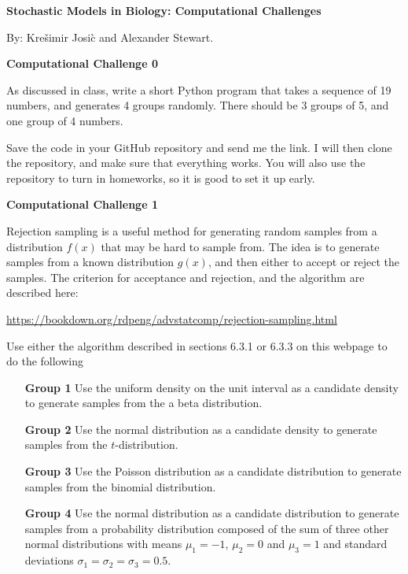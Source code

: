 \documentclass[12pt]{article}
\begin{document}
\begin{center}
{\Huge \bf Stochastic Models in Biology: Computational Challenges
\\ \vskip5mm  }
\end{center}

By: Kre\v simir Josi\`c and Alexander Stewart.

\begin{center}
{\Large \bf Computational Challenge 0
\\ \vskip5mm  }
\end{center}

As discussed in class, write a short Python program that takes a sequence of 19 numbers, and 
generates 4 groups randomly. There should be 3 groups of 5, and one group of 4 numbers.

Save the code in your GitHub repository and send me the link.  I will then clone the repository, and
make sure that everything works.  You will also use the repository to turn in homeworks, so 
it is good to set it up early.


\begin{center}
{\Large \bf Computational Challenge 1
\\ \vskip5mm }
\end{center}

Rejection sampling is a  useful method for generating random samples from a distribution $f(x)$ that 
may be hard to sample from.  The idea is to generate samples from a known distribution $g(x)$, and
then either to accept or reject the samples.  The criterion for acceptance and rejection,  and the algorithm are described here:

\vskip5mm

\href{https://bookdown.org/rdpeng/advstatcomp/rejection-sampling.html}{https://bookdown.org/rdpeng/advstatcomp/rejection-sampling.html}

\vskip5mm

Use either the algorithm described in sections 6.3.1 or 6.3.3 on this webpage to do the following

\begin{enumerate}
\item[\bf Group 1] Use the uniform density on the unit interval as a candidate density to generate samples from the a beta distribution.
\item[\bf Group 2] Use the normal distribution as a candidate density to generate samples from the $t$-distribution.
\item[\bf Group 3] Use the Poisson distribution as a candidate distribution to generate samples from the binomial distribution.
\item[\bf Group 4] Use the normal distribution as a candidate distribution to generate samples from a probability distribution composed of the sum of three other normal distributions with means $\mu_1=-1$, $\mu_2=0$ and $\mu_3=1$ and standard deviations $\sigma_1=\sigma_2=\sigma_3=0.5$.
\end{enumerate}
\end{document}
